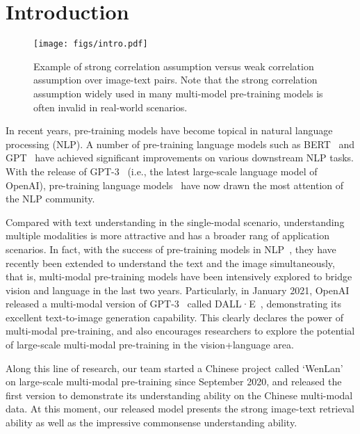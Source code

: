\documentclass[10pt,twocolumn,letterpaper]{article}
\begin{document}
\section{Introduction}

\begin{figure}[t]
    \centering
    \texttt{[image: figs/intro.pdf]}
\caption{
    Example of strong correlation assumption versus weak correlation assumption over image-text pairs. Note that the strong correlation assumption widely used in many multi-model pre-training models is often invalid in real-world scenarios. }
    \label{fig:intro}
    \vspace{-0.05in}
\end{figure}

In recent years, pre-training models have become topical in natural language processing (NLP). A number of pre-training language models such as BERT~\cite{devlin2018bert,liu2019roberta,Lan2020ALBERT} and GPT~\cite{radford2018improving,radford2019language,brown2020language} have achieved significant improvements on various downstream NLP tasks. With the release of GPT-3~\cite{brown2020language} (i.e., the latest large-scale language model of OpenAI), pre-training language models~\cite{radford2021learning,roberts2020much,guu2020realm} have now drawn the most attention of the NLP community.

Compared with text understanding in the single-modal scenario, understanding multiple modalities is more attractive and has a broader rang of application scenarios. In fact, with the success of pre-training models in NLP~\cite{dai2015semi,peters2018deep,howard2018universal,raffel2019exploring}, they have recently been extended to understand the text and the image simultaneously, that is, multi-modal pre-training models have been intensively explored to bridge vision and language in the last two years. Particularly, in January 2021, OpenAI released a multi-modal version of GPT-3~\cite{brown2020language} called DALL·E~\cite{aditya2021dall}, demonstrating its excellent text-to-image generation capability. This clearly declares the power of multi-modal pre-training, and also encourages researchers to explore the potential of large-scale multi-modal pre-training in the vision+language area.

Along this line of research, our team started a Chinese project called `WenLan' on large-scale multi-modal pre-training since September 2020, and released the first version to demonstrate its understanding ability on the Chinese multi-modal data. At this moment, our released model presents the strong image-text retrieval ability as well as the impressive commonsense understanding ability.
\end{document}
